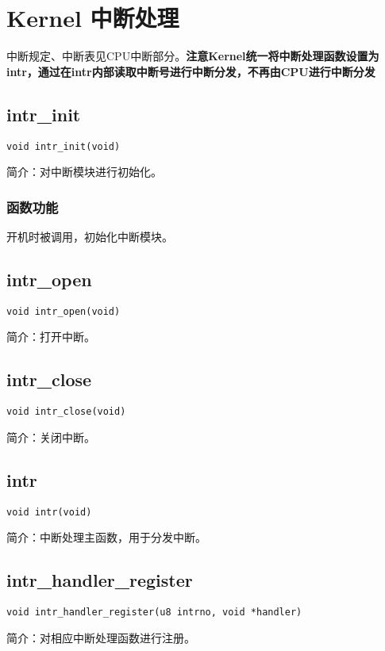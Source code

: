 %
%
%
%
%
%
%
%

\chapter{Kernel 中断处理}
中断规定、中断表见CPU中断部分。\textbf{注意Kernel统一将中断处理函数设置为intr，通过在intr内部读取中断号进行中断分发，不再由CPU进行中断分发}
\section{intr\_init}
\texttt{void intr\_init(void)}

简介：对中断模块进行初始化。

\subsection{函数功能}

开机时被调用，初始化中断模块。

\section{intr\_open}
\texttt{void intr\_open(void)}

简介：打开中断。

\section{intr\_close}
\texttt{void intr\_close(void)}

简介：关闭中断。

\section{intr}
\texttt{void intr(void)}

简介：中断处理主函数，用于分发中断。

\section{intr\_handler\_register}
\texttt{void intr\_handler\_register(u8 intrno, void *handler)}

简介：对相应中断处理函数进行注册。